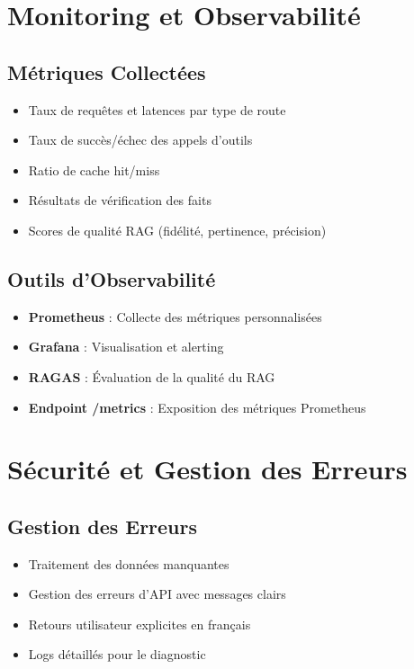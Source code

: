 \documentclass[12pt,a4paper]{article}
\begin{document}
\section*{Monitoring et Observabilité}

\subsection*{Métriques Collectées}
\begin{itemize}
    \item Taux de requêtes et latences par type de route
    \item Taux de succès/échec des appels d'outils
    \item Ratio de cache hit/miss
    \item Résultats de vérification des faits
    \item Scores de qualité RAG (fidélité, pertinence, précision)
\end{itemize}

\subsection*{Outils d'Observabilité}
\begin{itemize}
    \item \textbf{Prometheus} : Collecte des métriques personnalisées
    \item \textbf{Grafana} : Visualisation et alerting
    \item \textbf{RAGAS} : Évaluation de la qualité du RAG
    \item \textbf{Endpoint /metrics} : Exposition des métriques Prometheus
\end{itemize}

\section*{Sécurité et Gestion des Erreurs}

\subsection*{Gestion des Erreurs}
\begin{itemize}
    \item Traitement des données manquantes
    \item Gestion des erreurs d'API avec messages clairs
    \item Retours utilisateur explicites en français
    \item Logs détaillés pour le diagnostic
\end{itemize}
\end{document}
